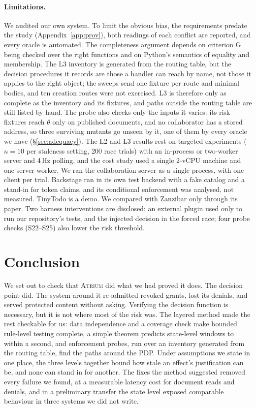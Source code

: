 \documentclass[sigconf,review,anonymous]{acmart}
\newcommand{\sysname}{\textsc{Atrium}\xspace}
\newcommand{\sysname}{\textsc{OpenZTAC}\xspace}
\begin{document}
\paragraph{Limitations.} We audited our own system. To limit the obvious bias, the requirements predate the
study (Appendix~\ref{app:prov}), both readings of each conflict are reported, and every oracle is automated. The
completeness argument depends on criterion G being checked over the right functions and on Python's semantics of
equality and membership. The L3 inventory is generated from the routing table, but the decision procedures it records are those a
handler can reach by name, not those it applies to the right object; the sweeps send one fixture per route and
minimal bodies, and ten creation routes were not exercised. L3 is therefore only as complete as the inventory and
its fixtures, and paths outside the routing table are still listed by hand. The probe also checks only the inputs it varies: its risk fixtures reach $\theta$ only on published documents, and no collaborator has a stored address, so three surviving mutants go unseen by it, one of them by every oracle we have (\S\ref{sec:adequacy}).
The L2 and L3 results rest on targeted experiments ($n=10$ per staleness setting, 200 race trials) with an
in-process or two-worker server and 4\,Hz polling, and the cost study used a single 2-vCPU machine and one
server worker. We ran the collaboration server as a single process, with one client per trial.
Backstage ran in its own test backend with a fake catalog and a stand-in for token claims, and its conditional
enforcement was analysed, not measured. TinyTodo is a demo. We compared with Zanzibar only through its paper.
Two harness interventions are disclosed: an external plugin used only to run our repository's tests, and the
injected decision in the forced race; four probe checks (S22--S25) also lower the risk threshold.

\section{Conclusion}

We set out to check that \sysname did what we had proved it does. The decision point did. The system around it
re-admitted revoked grants, lost its denials, and served protected content without asking. Verifying the
decision function is necessary, but it is not where most of the risk was. The layered method made the rest
checkable for us: data independence and a coverage check make bounded rule-level testing complete, a simple
theorem predicts state-level windows to within a second, and enforcement probes, run over an inventory generated
from the routing table, find the paths around the PDP. Under assumptions we state in one place, the three levels
together bound how stale an effect's justification can be, and none can stand in for another. The fixes the method
suggested removed every failure we found, at a measurable latency cost for document reads and denials, and in a
preliminary transfer the state level exposed comparable behaviour in three systems we did not write.
\end{document}
